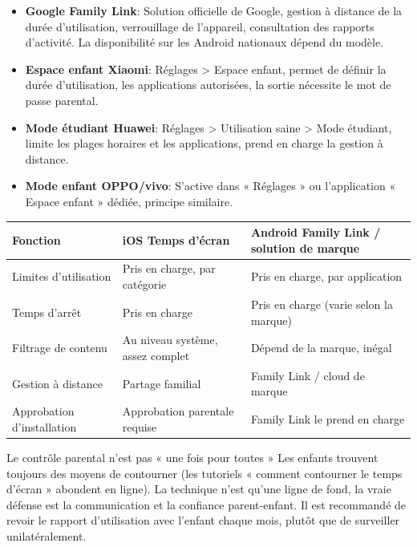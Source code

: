 
\begin{itemize}
  \item \textbf{Google Family Link}: Solution officielle de Google, gestion à distance de la durée d'utilisation, verrouillage de l'appareil, consultation des rapports d'activité. La disponibilité sur les Android nationaux dépend du modèle.
  \item \textbf{Espace enfant Xiaomi}: Réglages > Espace enfant, permet de définir la durée d'utilisation, les applications autorisées, la sortie nécessite le mot de passe parental.
  \item \textbf{Mode étudiant Huawei}: Réglages > Utilisation saine > Mode étudiant, limite les plages horaires et les applications, prend en charge la gestion à distance.
  \item \textbf{Mode enfant OPPO/vivo}: S'active dans « Réglages » ou l'application « Espace enfant » dédiée, principe similaire.
\end{itemize}

\begin{center}
\begin{tabularx}{\linewidth}{|X|X|X|}
\hline
\textbf{Fonction} & \textbf{iOS Temps d'écran} & \textbf{Android Family Link / solution de marque} \tabularnewline
\hline
Limites d'utilisation & Pris en charge, par catégorie & Pris en charge, par application \tabularnewline
Temps d'arrêt & Pris en charge & Pris en charge (varie selon la marque) \tabularnewline
Filtrage de contenu & Au niveau système, assez complet & Dépend de la marque, inégal \tabularnewline
Gestion à distance & Partage familial & Family Link / cloud de marque \tabularnewline
Approbation d'installation & Approbation parentale requise & Family Link le prend en charge \tabularnewline
\hline
\end{tabularx}
\end{center}

\begin{tcbwarn}{Le contrôle parental n'est pas « une fois pour toutes »}
Les enfants trouvent toujours des moyens de contourner (les tutoriels « comment contourner le temps d'écran » abondent en ligne). La technique n'est qu'une ligne de fond, la vraie défense est la communication et la confiance parent-enfant. Il est recommandé de revoir le rapport d'utilisation avec l'enfant chaque mois, plutôt que de surveiller unilatéralement.

\end{tcbwarn}

